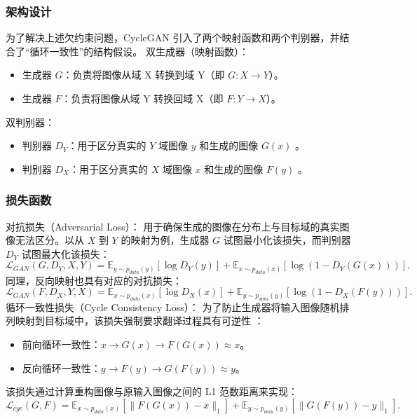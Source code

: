    \subsubsection{架构设计}
      为了解决上述欠约束问题，CycleGAN 引入了两个映射函数和两个判别器，并结合了“循环一致性”的结构假设。
      双生成器（映射函数）：
      \begin{itemize}
        \item 生成器 $G$：负责将图像从域 X 转换到域 Y（即 $G:X \to Y$）。
        \item 生成器 $F$：负责将图像从域 Y 转换回域 X（即 $F:Y \to X$）。
      \end{itemize}
      双判别器：
      \begin{itemize}
        \item 判别器 $D_Y$：用于区分真实的 $Y$ 域图像 $y$ 和生成的图像 $G(x)$ 。
        \item 判别器 $D_X$：用于区分真实的 $X$ 域图像 $x$ 和生成的图像 $F(y)$ 。
      \end{itemize}
    \subsubsection{损失函数}
      对抗损失（Adversarial Loss）：
      用于确保生成的图像在分布上与目标域的真实图像无法区分。以从 $X$ 到 $Y$ 的映射为例，生成器 $G$ 试图最小化该损失，而判别器 $D_Y$ 试图最大化该损失：
      \begin{equation}
        \mathcal{L}_{GAN}(G, D_Y, X, Y) = \mathbb{E}_{y \sim p_{data}(y)} [\log D_Y(y)] + \mathbb{E}_{x \sim p_{data}(x)} [\log (1 - D_Y(G(x)))].
      \end{equation}
      同理，反向映射也具有对应的对抗损失：
      \begin{equation}
        \mathcal{L}_{GAN}(F, D_X, Y, X) = \mathbb{E}_{x \sim p_{data}(x)} [\log D_X(x)] + \mathbb{E}_{y \sim p_{data}(y)} [\log (1 - D_X(F(y)))].
      \end{equation}
      循环一致性损失（Cycle Consistency Loss）：
      为了防止生成器将输入图像随机排列映射到目标域中，该损失强制要求翻译过程具有可逆性 ：
      \begin{itemize}
        \item 前向循环一致性：$x \to G(x) \to F(G(x)) \approx x$。
        \item 反向循环一致性：$y \to F(y) \to G(F(y)) \approx y$。
      \end{itemize}
      该损失通过计算重构图像与原输入图像之间的 L1 范数距离来实现：
      \begin{equation}
        \mathcal{L}_{cyc}(G, F) = \mathbb{E}_{x \sim p_{data}(x)} [\| F(G(x)) - x \|_1] + \mathbb{E}_{y \sim p_{data}(y)} [\| G(F(y)) - y \|_1].
      \end{equation}
